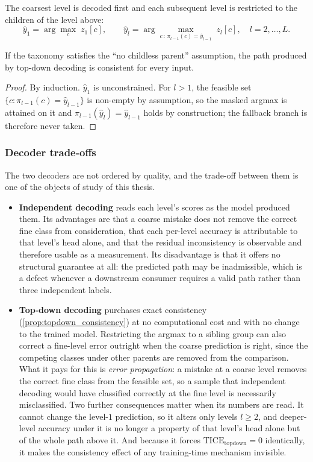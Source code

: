 The coarsest level is decoded first and each
subsequent level is restricted to the children of the level above:
\[
\hat y_1=\arg\max_{c}\;z_1[c],
\qquad
\hat y_{l}=\arg\max_{c\,:\,\pi_{l-1}(c)=\hat y_{l-1}}\; z_{l}[c],
\quad l=2,\dots,L .
\]

\begin{proposition}
\label{prop:topdown_consistency}
If the taxonomy satisfies the ``no childless parent'' assumption, the path
produced by top-down decoding is consistent for every input.
\end{proposition}
\begin{proof}
By induction. $\hat y_1$ is unconstrained. For $l>1$, the feasible set
$\{c:\pi_{l-1}(c)=\hat y_{l-1}\}$ is non-empty by assumption, so the masked argmax
is attained on it and $\pi_{l-1}(\hat y_l)=\hat y_{l-1}$ holds by construction; the
fallback branch is therefore never taken.
\end{proof}

\subsubsection{Decoder trade-offs}

The two decoders are not ordered by quality, and the trade-off between them is one
of the objects of study of this thesis.

\begin{itemize}
    \item \textbf{Independent decoding} reads each level's scores as the model
    produced them. Its advantages are that a coarse mistake does not remove the
    correct fine class from consideration, that each per-level accuracy is
    attributable to that level's head alone, and that the residual inconsistency is
    observable and therefore usable as a measurement. Its disadvantage is that it
    offers no structural guarantee at all: the predicted path may be inadmissible,
    which is a defect whenever a downstream consumer requires a valid path rather
    than three independent labels.
    \item \textbf{Top-down decoding} purchases exact consistency
    (\cref{prop:topdown_consistency}) at no computational cost and with no change to
    the trained model. Restricting the argmax to a sibling group can also correct a
    fine-level error outright when the coarse prediction is right, since the
    competing classes under other parents are removed from the comparison. What it
    pays for this is \emph{error propagation}: a mistake at a coarse level removes
    the correct fine class from the feasible set, so a sample that independent
    decoding would have classified correctly at the fine level is necessarily
    misclassified. Two further consequences matter when its numbers are read. It
    cannot change the level-$1$ prediction, so it alters only levels $l\ge2$, and
    deeper-level accuracy under it is no longer a property of that level's head
    alone but of the whole path above it. And because it forces
    $\mathrm{TICE}_{\text{topdown}}=0$ identically, it makes the consistency effect
    of any training-time mechanism invisible.
\end{itemize}

